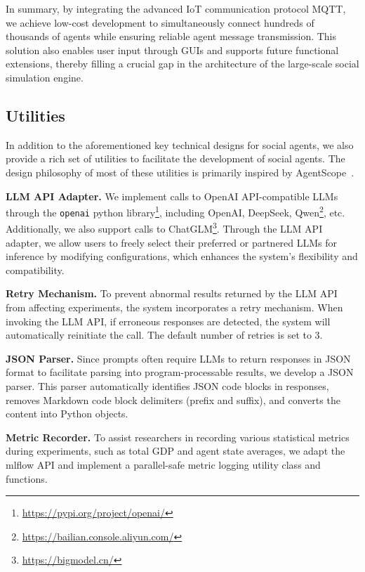 In summary, by integrating the advanced IoT communication protocol MQTT, we achieve low-cost development to simultaneously connect hundreds of thousands of agents while ensuring reliable agent message transmission.
This solution also enables user input through GUIs and supports future functional extensions, thereby filling a crucial gap in the architecture of the large-scale social simulation engine.

\subsection{Utilities}\label{sec:sim:util}

In addition to the aforementioned key technical designs for social agents, we also provide a rich set of utilities to facilitate the development of social agents.
The design philosophy of most of these utilities is primarily inspired by AgentScope~\cite{gao2024agentscope}.

\textbf{LLM API Adapter.}
We implement calls to OpenAI API-compatible LLMs through the \texttt{openai} python library\footnote{\url{https://pypi.org/project/openai/}}, including OpenAI, DeepSeek, Qwen\footnote{\url{https://bailian.console.aliyun.com/}}, etc.
Additionally, we also support calls to ChatGLM\footnote{\url{https://bigmodel.cn/}}.
Through the LLM API adapter, we allow users to freely select their preferred or partnered LLMs for inference by modifying configurations, which enhances the system's flexibility and compatibility.

\textbf{Retry Mechanism.}
To prevent abnormal results returned by the LLM API from affecting experiments, the system incorporates a retry mechanism.
When invoking the LLM API, if erroneous responses are detected, the system will automatically reinitiate the call. The default number of retries is set to 3.

\textbf{JSON Parser.}
Since prompts often require LLMs to return responses in JSON format to facilitate parsing into program-processable results, we develop a JSON parser.
This parser automatically identifies JSON code blocks in responses, removes Markdown code block delimiters (prefix and suffix), and converts the content into Python objects.

\textbf{Metric Recorder.}
To assist researchers in recording various statistical metrics during experiments, such as total GDP and agent state averages, we adapt the mlflow API and implement a parallel-safe metric logging utility class and functions.

